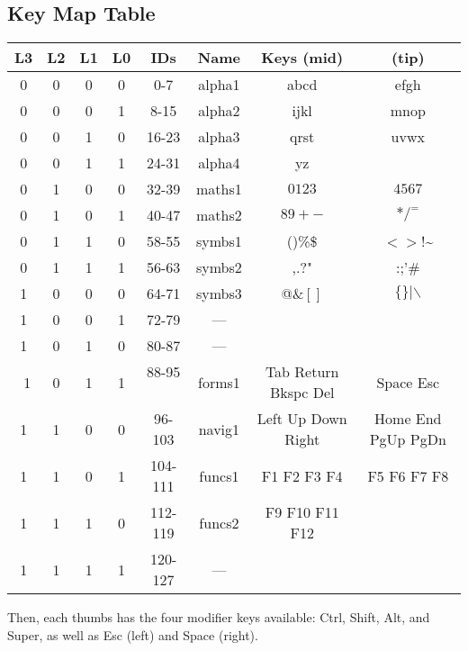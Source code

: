 \documentclass{article}
\begin{document}
\subsection{Key Map Table}
\begin{center}
\begin{tabular}{|c|c|c|c|c|c|cc|}
  \hline
  L3 & L2 & L1 & L0 & IDs     & Name   & Keys (mid) & (tip) \\ \hline
  0  & 0  & 0  & 0  & 0-7     & alpha1 & abcd       & efgh \\ \hline
  0  & 0  & 0  & 1  & 8-15    & alpha2 & ijkl       & mnop \\ \hline
  0  & 0  & 1  & 0  & 16-23   & alpha3 & qrst       & uvwx \\ \hline
  0  & 0  & 1  & 1  & 24-31   & alpha4 & yz         &      \\ \hline
  0  & 1  & 0  & 0  & 32-39   & maths1 & $0123$     & $4567$ \\ \hline
  0  & 1  & 0  & 1  & 40-47   & maths2 & $89+-$     & $*/^=$ \\ \hline
  0  & 1  & 1  & 0  & 58-55   & symbs1 &()\%\$      & $<>$!\textasciitilde \\ \hline
  0  & 1  & 1  & 1  & 56-63   & symbs2 & ,.?"       & :;'\#\\ \hline
  1  & 0  & 0  & 0  & 64-71   & symbs3 & @\&$[]$    & $\{\}|\backslash$ \\ \hline
  1  & 0  & 0  & 1  & 72-79   &  ---   && \\ \hline
  1  & 0  & 1  & 0  & 80-87   &  ---   && \\ \hline
  1  & 0  & 1  & 1  & 88-95   & forms1 & Tab Return Bkspc Del & Space Esc \\ \hline
  1  & 1  & 0  & 0  & 96-103  & navig1 & Left Up Down Right & Home End PgUp PgDn \\ \hline
  1  & 1  & 0  & 1  & 104-111 & funcs1 & F1 F2 F3 F4 & F5 F6 F7 F8 \\ \hline
  1  & 1  & 1  & 0  & 112-119 & funcs2 & F9 F10 F11 F12 & \\ \hline
  1  & 1  & 1  & 1  & 120-127 &  ---   && \\ \hline
\end{tabular}
\end{center}

Then, each thumbs has the four modifier keys available: Ctrl, Shift, Alt, and Super, as well as Esc (left) and Space (right).
\end{document}
